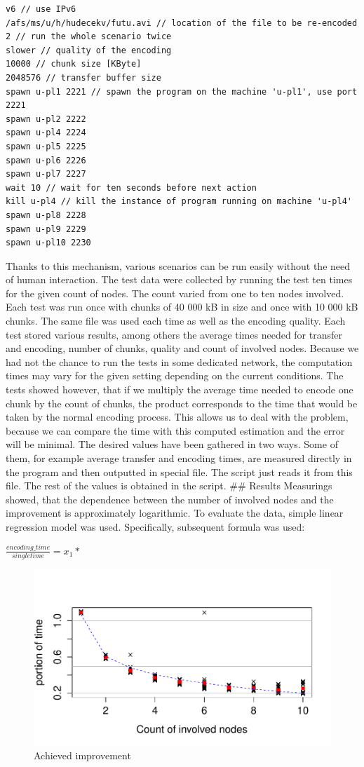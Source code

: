 \begin{verbatim}
v6 // use IPv6
/afs/ms/u/h/hudecekv/futu.avi // location of the file to be re-encoded
2 // run the whole scenario twice
slower // quality of the encoding
10000 // chunk size [KByte]
2048576 // transfer buffer size
spawn u-pl1 2221 // spawn the program on the machine 'u-pl1', use port 2221
spawn u-pl2 2222
spawn u-pl4 2224
spawn u-pl5 2225
spawn u-pl6 2226
spawn u-pl7 2227
wait 10 // wait for ten seconds before next action
kill u-pl4 // kill the instance of program running on machine 'u-pl4'
spawn u-pl8 2228
spawn u-pl9 2229
spawn u-pl10 2230
\end{verbatim}

Thanks to this mechanism, various scenarios can be run easily without
the need of human interaction. The test data were collected by running
the test ten times for the given count of nodes. The count varied from
one to ten nodes involved. Each test was run once with chunks of 40 000
kB in size and once with 10 000 kB chunks. The same file was used each
time as well as the encoding quality. Each test stored various results,
among others the average times needed for transfer and encoding, number
of chunks, quality and count of involved nodes. Because we had not the
chance to run the tests in some dedicated network, the computation times
may vary for the given setting depending on the current conditions. The
tests showed however, that if we multiply the average time needed to
encode one chunk by the count of chunks, the product corresponds to the
time that would be taken by the normal encoding process. This allows us
to deal with the problem, because we can compare the time with this
computed estimation and the error will be minimal. The desired values
have been gathered in two ways. Some of them, for example average
transfer and encoding times, are measured directly in the program and
then outputted in special file. The script just reads it from this file.
The rest of the values is obtained in the script. \#\# Results
Measurings showed, that the dependence between the number of involved
nodes and the improvement is approximately logarithmic. To evaluate the
data, simple linear regression model was used. Specifically, subsequent
formula was used:

\begin{center}
$\frac{encoding\_time}{singletime} = x_1 *$
\end{center}

\begin{figure}[h]
\begin{center}
\includegraphics[scale=0.90]{./img/improvement.pdf}
\caption{Achieved improvement}
\end{center}
\end{figure}
